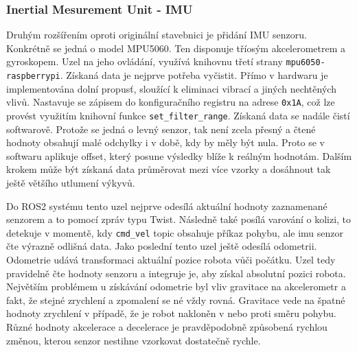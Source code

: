 \subsubsection*{Inertial Mesurement Unit - IMU}
Druhým rozšířením oproti originální stavebnici je přidání IMU senzoru. Konkrétně se jedná o model MPU5060. Ten disponuje tříosým akcelerometrem a gyroskopem. Uzel na jeho ovládání, využívá knihovnu třetí strany \verb|mpu6050-raspberrypi|. Získaná data je nejprve potřeba vyčistit. Přímo v hardwaru je implementována dolní propusť, sloužící k eliminaci vibrací a jiných nechtěných vlivů. Nastavuje se zápisem do konfiguračního registru na adrese \verb|0x1A|, což lze provést využitím knihovní funkce \verb|set_filter_range|. Získaná data se nadále čistí softwarově. Protože se jedná o levný senzor, tak není zcela přesný a čtené hodnoty obsahují malé odchylky i v době, kdy by měly být nula. Proto se v softwaru aplikuje offset, který posune výsledky blíže k reálným hodnotám. Dalším krokem může být získaná data průměrovat mezi více vzorky a dosáhnout tak ještě většího utlumení výkyvů. 

Do ROS2 systému tento uzel nejprve odesílá aktuální hodnoty zaznamenané senzorem a to pomocí zpráv typu Twist. Následně také posílá varování o kolizi, to detekuje v momentě, kdy \verb|cmd_vel| topic obsahuje příkaz pohybu, ale imu senzor čte výrazně odlišná data. Jako poslední tento uzel ještě odesílá odometrii. Odometrie udává transformaci aktuální pozice robota vůči počátku. Uzel tedy pravidelně čte hodnoty senzoru a integruje je, aby získal absolutní pozici robota. Největším problémem u získávání odometrie byl vliv gravitace na akcelerometr a fakt, že stejné zrychlení a zpomalení se né vždy rovná. Gravitace vede na špatné hodnoty zrychlení v případě, že je robot nakloněn v nebo proti směru pohybu. Různé hodnoty akcelerace a decelerace je pravděpodobně způsobená rychlou změnou, kterou senzor nestihne vzorkovat dostatečně rychle.

